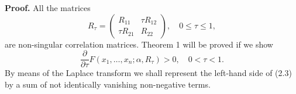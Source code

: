 \documentclass[12pt,twoside]{article}
\numberwithin{equation}{section}
\theoremstyle{plain}
\begin{document}
\bigskip

\noindent
{\bf Proof.}  All the matrices
\begin{equation}
\label{2.2}
R_\tau = \begin{pmatrix} R_{11} & \tau R_{12} \\ \tau R_{21} & R_{22}\end{pmatrix}, \quad 0 \le \tau \le 1,
\end{equation}
are non-singular correlation matrices. Theorem 1 will be proved if we show 
\begin{equation}
\label{2.3}
\frac{\partial}{\partial\tau} F(x_1,\ldots,x_n;\alpha,R_\tau) > 0, \quad 0 < \tau < 1.
\end{equation}
By means of the Laplace transform we shall represent the left-hand side of (2.3) by a sum of not identically vanishing non-negative terms.
\end{document}
